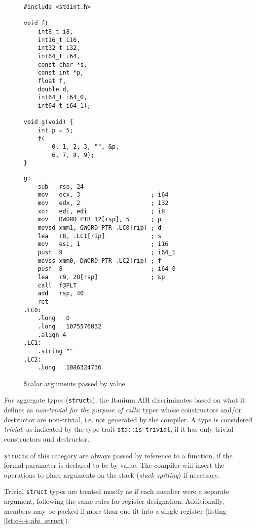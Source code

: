 \begin{figure}[ht]
    {\setlength{\columnsep}{-8em}\begin{multicols}{2}
        \begin{lstlisting}[style=c]
#include <stdint.h>

void f(
    int8_t i8,
    int16_t i16,
    int32_t i32,
    int64_t i64,
    const char *s,
    const int *p,
    float f,
    double d,
    int64_t i64_0,
    int64_t i64_1);

void g(void) {
    int p = 5;
    f(
        0, 1, 2, 3, "", &p,
        6, 7, 8, 9);
}
        \end{lstlisting}
        \columnbreak
        \begin{lstlisting}[style=x86]
g:
    sub   rsp, 24
    mov   ecx, 3                    ; i64
    mov   edx, 2                    ; i32
    xor   edi, edi                  ; i8
    mov   DWORD PTR 12[rsp], 5      ; p
    movsd xmm1, QWORD PTR .LC0[rip] ; d
    lea   r8, .LC1[rip]             ; s
    mov   esi, 1                    ; i16
    push  9                         ; i64_1
    movss xmm0, DWORD PTR .LC2[rip] ; f
    push  8                         ; i64_0
    lea   r9, 28[rsp]               ; &p
    call  f@PLT
    add   rsp, 40
    ret
.LC0:
	.long	0
	.long	1075576832
	.align 4
.LC1:
	.string	""
.LC2:
	.long	1086324736
        \end{lstlisting}
    \end{multicols}}
    \caption{Scalar arguments passed by value}
    \label{lst:c++:abi_scalar}
\end{figure}

For aggregate types (\texttt{struct}s), the Itanium ABI discriminates based on
what it defines as \textit{non-trivial for the purpose of calls}: types whose
constructors and/or destructor are non-trivial, i.e. not generated by the
compiler.  A type is considered \textit{trivial}, as indicated by the type trait
\texttt{std::is\_trivial}, if it has only trivial constructors and destructor.

\texttt{struct}s of this category are always passed by reference to a function,
if the formal parameter is declared to be by-value.  The compiler will insert
the operations to place arguments on the stack (\textit{stack spilling}) if
necessary.

Trivial \texttt{struct} types are treated mostly as if each member were a
separate argument, following the same rules for register designation.
Additionally, members may be packed if more than one fit into a single register
(listing \ref{lst:c++:abi_struct}).

